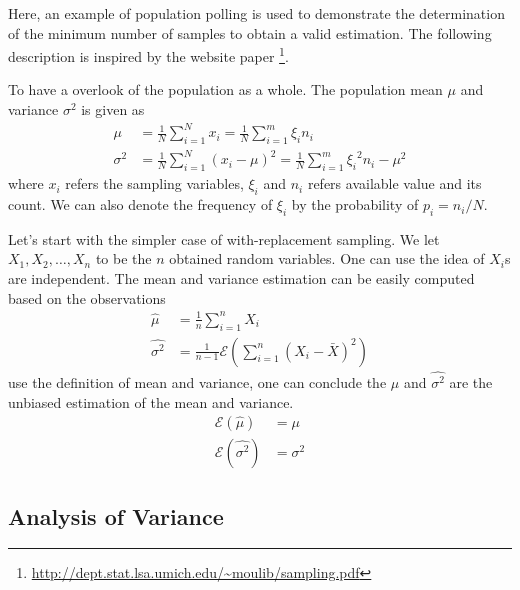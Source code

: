 Here, an example of population polling is used to demonstrate the determination of the minimum number of samples to obtain a valid estimation.
The following description is inspired by the website paper \footnote{\url{http://dept.stat.lsa.umich.edu/~moulib/sampling.pdf}}.

To have a overlook of the population as a whole.
The population mean $\mu$ and variance $\sigma^2$ is given as
\begin{align*}
    \mu      & = \frac{1}{N} \sum_{i=1}^{N} x_i = \frac{1}{N} \sum_{i=1}^{m} \xi_i n_i                       \\
    \sigma^2 & = \frac{1}{N} \sum_{i=1}^{N} (x_i - \mu)^2 = \frac{1}{N} \sum_{i=1}^{m} {\xi_i}^2 n_i - \mu^2
\end{align*}
where $x_i$ refers the sampling variables, $\xi_i$ and $n_i$ refers available value and its count.
We can also denote the frequency of $\xi_i$ by the probability of $p_i = n_i / N$.

Let's start with the simpler case of with-replacement sampling.
We let $X_1, X_2, \dots, X_n$ to be the $n$ obtained random variables.
One can use the idea of $X_i$s are independent.
The mean and variance estimation can be easily computed based on the observations
\begin{align*}
    \hat{\mu}      & = \frac{1}{n} \sum_{i=1}^{n} X_i                              \\
    \hat{\sigma^2} & = \frac{1}{n-1} \mathcal{E}(\sum_{i=1}^{n} (X_i - \bar{X})^2)
\end{align*}
use the definition of mean and variance,
one can conclude the $\hat{\mu}$ and $\hat{\sigma^2}$ are the unbiased estimation of the mean and variance.
\begin{align*}
    \mathcal{E}(\hat{\mu})      & = \mu      \\
    \mathcal{E}(\hat{\sigma^2}) & = \sigma^2
\end{align*}

\subsection{Analysis of Variance}

